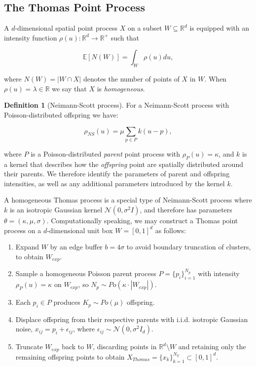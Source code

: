 \documentclass[letterpaper]{article}
\newcommand{\R}{\mathbb{R}}
\newcommand{\E}{\mathbb{E}}
\newcommand{\1}{\mathds{1}}
\newcommand{\kpar}{\kappa}
\newcommand{\cs}{\sigma}
\newcommand{\mo}{\mu}
\theoremstyle{plain}
\theoremstyle{definition}
\newtheorem{definition}[theorem]{Definition}
\theoremstyle{remark}
\begin{document}
\subsection{The Thomas Point Process}
A $d$-dimensional spatial point process $X$ on a subset $W \subseteq \R^d$ is equipped with an intensity function $\rho(u): \R^d \rightarrow \R^+$ such that

    \[
    \E[N(W)] = \int_W \rho(u) du,
    \]
    
where $N(W) = |W \cap X|$ denotes the number of points of $X$ in $W$. When $\rho(u) = \lambda \in \R$ we say that $X$ is \emph{homogeneous}.

    \begin{definition}[Neimann-Scott process]
        For a Neimann-Scott process with Poisson-distributed offspring we have:
        
            \[
            \rho_{NS}(u) = \mo \sum_{p \in P} k(u - p),
            \]
            
        where $P$ is a Poisson-distributed \emph{parent} point process with $\rho_P(u) = \kpar$, and $k$ is a kernel that describes how the \emph{offspring} point are spatially distributed around their parents. We therefore identify the parameters of parent and offspring intensities, as well as any additional parameters introduced by the kernel $k$.
    \end{definition}

A homogeneous Thomas process is a special type of Neimann-Scott process where $k$ is an isotropic Gaussian kernel $\mathcal{N}(0, \cs^2I)$, and therefore has parameters $\theta = (\kpar, \mo, \cs)$. Computationally speaking, we may construct a Thomas point process on a $d$-dimensional unit box $W = [0, 1]^d$ as follows:

    \begin{enumerate}
        \item Expand $W$ by an edge buffer $b = 4\cs$ to avoid boundary truncation of clusters, to obtain $W_{exp}$.
        \item Sample a homogeneous Poisson parent process $P = \{p_i\}_{i=1}^{N_p}$ with intensity $\rho_P(u) = \kpar$ on $W_{exp}$, so $N_p \sim Po(\kpar \cdot |W_{exp}|)$.
        \item Each $p_i \in P$ produces $K_p \sim Po(\mo)$ offspring.
        \item Displace offspring from their respective parents with i.i.d. isotropic Gaussian noise, $x_{ij} = p_i + \epsilon_{ij}$, where $\epsilon_{ij} \sim \mathcal{N}(0, \sigma^2I_d)$.
        \item Truncate $W_{exp}$ back to $W$, discarding points in $\R^d \setminus W$ and retaining only the remaining offspring points to obtain $X_{Thomas} = \{x_k\}_{k=1}^{N_T} \subset [0, 1]^d$.
    \end{enumerate}
\end{document}
